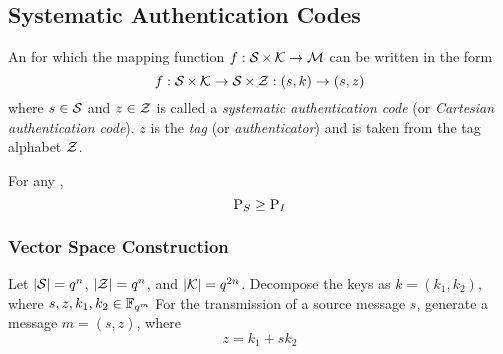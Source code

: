 \subsection{Systematic Authentication Codes}\label{subsec:Systematic_Authentication_Codes}
\begin{definition}\label{def:Systematic_Authentication_Code}
  An  for which the mapping function $f : \operatorname{\mathcal{S}} \times \operatorname{\mathcal{K}} \to \operatorname{\mathcal{M}}$ can be written in the form
  \begin{equation}\label{eq:Systematic_Authentication_Codes}
    f : \operatorname{\mathcal{S}} \times \operatorname{\mathcal{K}} \to \operatorname{\mathcal{S}} \times \operatorname{\mathcal{Z}} : (s, k) \to (s, z)
  \end{equation}
  where $s \in \operatorname{\mathcal{S}}$ and $z \in \operatorname{\mathcal{Z}}$ is called a \emph{systematic authentication code} (or \emph{Cartesian authentication code}).
  $z$ is the \emph{tag} (or \emph{authenticator}) and is taken from the tag alphabet $\operatorname{\mathcal{Z}}$.
\end{definition}

\begin{theorem}\label{thm:Bounds_Systematic_Authentication_Code}
  For any ,
  \begin{equation}\label{eq:Bounds_Systematic_Authentication_Code}
    \operatorname{\operatorname{P}}_{S} \geq \operatorname{\operatorname{P}}_{I}
  \end{equation}
\end{theorem}

\subsubsection{Vector Space Construction}\label{subsubsec:Systematic_Authentication_Code-Vector_Space}
Let $\lvert \operatorname{\mathcal{S}} \rvert = q^{n}$, $\lvert \operatorname{\mathcal{Z}} \rvert = q^{n}$, and $\lvert \operatorname{\mathcal{K}} \rvert = q^{2n}$.
Decompose the keys as $k = (k_{1}, k_{2})$, where $s, z, k_{1}, k_{2} \in \mathbb{F}_{q^{m}}$
For the transmission of a source message $s$, generate a message $m = (s, z)$, where
\begin{equation*}
  z = k_{1} + sk_{2}
\end{equation*}

